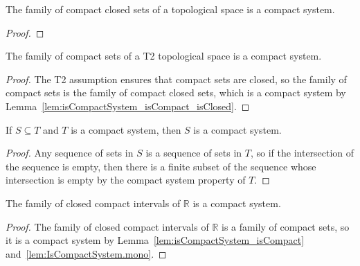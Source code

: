\begin{lemma}\label{lem:isCompactSystem_isCompact_isClosed}
  \mathlibok
The family of compact closed sets of a topological space is a compact system.
\end{lemma}

\begin{proof}\mathlibok

\end{proof}


\begin{lemma}\label{lem:isCompactSystem_isCompact}
  \mathlibok
The family of compact sets of a T2 topological space is a compact system.
\end{lemma}

\begin{proof}\mathlibok
The T2 assumption ensures that compact sets are closed, so the family of compact sets is the family of compact closed sets, which is a compact system by Lemma~\ref{lem:isCompactSystem_isCompact_isClosed}.
\end{proof}


\begin{lemma}\label{lem:IsCompactSystem.mono}
  \mathlibok
If $S \subseteq T$ and $T$ is a compact system, then $S$ is a compact system.
\end{lemma}

\begin{proof}\mathlibok
Any sequence of sets in $S$ is a sequence of sets in $T$, so if the intersection of the sequence is empty, then there is a finite subset of the sequence whose intersection is empty by the compact system property of $T$.
\end{proof}


\begin{lemma}\label{lem:isCompactSystem_Icc}
  \leanok
The family of closed compact intervals of $\mathbb{R}$ is a compact system.
\end{lemma}

\begin{proof}\leanok
The family of closed compact intervals of $\mathbb{R}$ is a family of compact sets, so it is a compact system by Lemma~\ref{lem:isCompactSystem_isCompact} and~\ref{lem:IsCompactSystem.mono}.
\end{proof}


